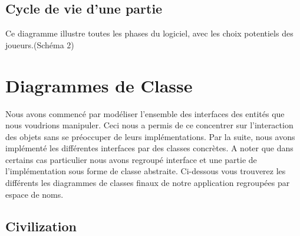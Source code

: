 	\subsection{Cycle de vie d'une partie}
	Ce diagramme illustre toutes les phases du logiciel, avec les choix potentiels des joueurs.(Schéma 2)
	
\section{Diagrammes de Classe}
Nous avons commencé par modéliser l'ensemble des interfaces des entités que nous voudrions manipuler. Ceci nous a permis de ce concentrer sur l'interaction des objets sans se préoccuper de leurs implémentations. Par la suite, nous avons implémenté les différentes interfaces par des classes concrètes. A noter que dans certains cas particulier nous avons regroupé interface et une partie de l'implémentation sous forme de classe abstraite. Ci-dessous vous trouverez les différents les diagrammes de classes finaux de notre application regroupées par espace de noms. 
	\subsection{Civilization}
